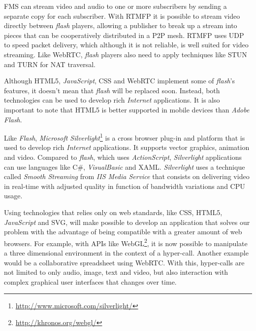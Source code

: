   \ac{FMS} can stream video and audio to one or more subscribers by sending a separate copy for each subscriber. With \ac{RTMFP} it is possible to stream video directly between \emph{flash} players, allowing a publisher to break up a stream into pieces that can be cooperatively distributed in a P2P mesh. \ac{RTMFP} uses \ac{UDP} to speed packet delivery, which although it is not reliable, is well suited for video streaming. Like \ac{WebRTC}, \emph{flash} players also need to apply techniques like \ac{STUN} and \ac{TURN} for \ac{NAT} traversal.

  Although \ac{HTML}5, \emph{JavaScript}, \ac{CSS} and \ac{WebRTC} implement some of \emph{flash}'s features, it doesn't mean that \emph{flash} will be replaced soon.
  Instead, both technologies can be used to develop rich \emph{Internet} applications.
  It is also important to note that \ac{HTML}5 is better supported in mobile devices than \emph{Adobe Flash}. 

  Like \emph{Flash}, \emph{Microsoft Silverlight}\footnote{\url{http://www.microsoft.com/silverlight/}} is a cross browser plug-in and platform that is used to develop rich \emph{Internet} applications. It supports vector graphics, animation and video. Compared to \emph{flash}, which uses \emph{ActionScript}, \emph{Silverlight} applications can use languages like C\#, \emph{VisualBasic} and \ac{XAML}. \emph{Silverlight} uses a technique called \emph{Smooth Streaming} from \emph{IIS Media Service} that consists on delivering video in real-time with adjusted quality in function of bandwidth variations and \ac{CPU} usage.

  Using technologies that relies only on web standards, like \ac{CSS}, \ac{HTML}5, \emph{JavaScript} and \ac{SVG}, will make possible to develop an application that solves our problem with the advantage of being compatible with a greater amount of web browsers.
  For example, with \ac{API}s like WebGL\footnote{\url{http://khronos.org/webgl/}}, it is now possible to manipulate a three dimensional environment in the context of a hyper-call. Another example would be a collaborative spreadsheet using \ac{WebRTC}. With this, hyper-calls are not limited to only audio, image, text and video, but also interaction with complex graphical user interfaces that changes over time.

